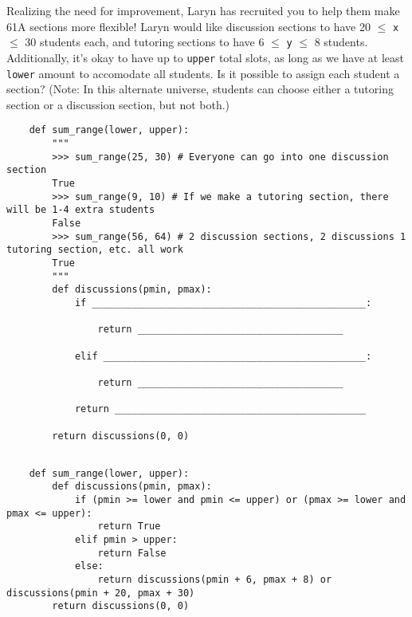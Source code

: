 \begin{blocksection}
    \question Realizing the need for improvement, Laryn has recruited you to help them make 61A sections more flexible! 
    Laryn would like discussion sections to have 20 $\leq$ \lstinline$x$ $\leq$ 30 students each, 
    and tutoring sections to have 6 $\leq$ \lstinline$y$ $\leq$ 8 students. 
    Additionally, it's okay to have up to \lstinline$upper$ total slots, as long as we have at least \lstinline$lower$ amount to accomodate all students.
    Is it possible to assign each student a section? (Note: In this alternate universe, students can choose either
    a tutoring section or a discussion section, but not both.)
    
    \begin{lstlisting}
    def sum_range(lower, upper):
        """
        >>> sum_range(25, 30) # Everyone can go into one discussion section
        True
        >>> sum_range(9, 10) # If we make a tutoring section, there will be 1-4 extra students
        False
        >>> sum_range(56, 64) # 2 discussion sections, 2 discussions 1 tutoring section, etc. all work
        True
        """
        def discussions(pmin, pmax):
            if ________________________________________________:
    
                return ____________________________________
    
            elif ______________________________________________:
    
                return ____________________________________
    
            return ____________________________________________
    
        return discussions(0, 0)
    
    \end{lstlisting}
    \end{blocksection}
    
    \begin{solution}[1.5in]
    \begin{blocksection}
    \begin{lstlisting}
    def sum_range(lower, upper):
        def discussions(pmin, pmax):
            if (pmin >= lower and pmin <= upper) or (pmax >= lower and pmax <= upper):
                return True
            elif pmin > upper:
                return False
            else:
                return discussions(pmin + 6, pmax + 8) or discussions(pmin + 20, pmax + 30)
        return discussions(0, 0)
    \end{lstlisting}
    
    \end{blocksection}
    \end{solution}
    
